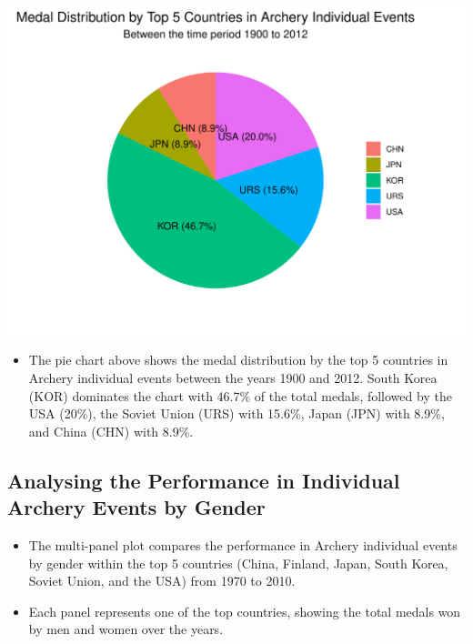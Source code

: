 \documentclass[12pt,preprint, authoryear]{elsarticle}
\let\origfigure\figure
\let\endorigfigure\endfigure
\renewenvironment{figure}[1][2] {
    \expandafter\origfigure\expandafter[H]
} {
    \endorigfigure
}
\numberwithin{equation}{section}
\numberwithin{figure}{section}
\numberwithin{table}{section}
\def\tightlist{} %
\begin{document}
\begin{figure}

{\centering \includegraphics{README_files/figure-latex/unnamed-chunk-5-1} 

}

\caption{A Pie Chart showcasing the Distibution of Medal Winnings by the Top 5 Countries in Individual Archery Events\label{Figure5}}\label{fig:unnamed-chunk-5}
\end{figure}

\begin{itemize}
\tightlist
\item
  The pie chart above shows the medal distribution by the top 5
  countries in Archery individual events between the years 1900 and
  2012. South Korea (KOR) dominates the chart with 46.7\% of the total
  medals, followed by the USA (20\%), the Soviet Union (URS) with
  15.6\%, Japan (JPN) with 8.9\%, and China (CHN) with 8.9\%.
\end{itemize}

\hypertarget{analysing-the-performance-in-individual-archery-events-by-gender}{%
\subsection{Analysing the Performance in Individual Archery Events by
Gender}\label{analysing-the-performance-in-individual-archery-events-by-gender}}

\begin{itemize}
\item
  The multi-panel plot compares the performance in Archery individual
  events by gender within the top 5 countries (China, Finland, Japan,
  South Korea, Soviet Union, and the USA) from 1970 to 2010.
\item
  Each panel represents one of the top countries, showing the total
  medals won by men and women over the years.
\end{itemize}
\end{document}
